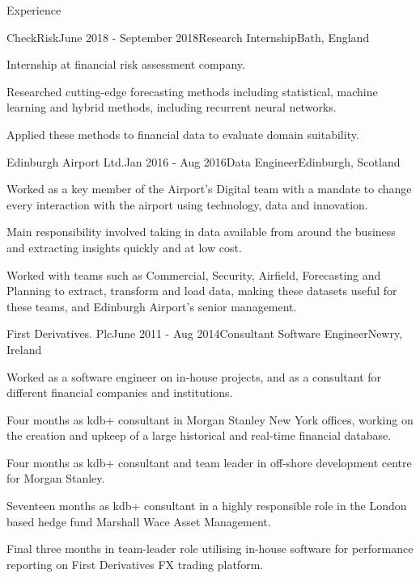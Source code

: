 \documentclass{resume} %
\begin{document}
\begin{rSection}{Experience}
  \begin{rSubsection}{CheckRisk}{June 2018 - September 2018}{Research Internship}{Bath, England}
    \item Internship at financial risk assessment company.
    \item Researched cutting-edge forecasting methods including statistical, machine learning and hybrid methods, including recurrent neural networks.
    \item Applied these methods to financial data to evaluate domain suitability.
  \end{rSubsection}

  \begin{rSubsection}{Edinburgh Airport Ltd.}{Jan 2016 - Aug 2016}{Data Engineer}{Edinburgh, Scotland}
    \item Worked as a key member of the Airport's Digital team with a mandate to change every interaction with the airport using technology, data and innovation.
    \item Main responsibility involved taking in data available from around the business and extracting insights quickly and at low cost.
    \item Worked with teams such as Commercial, Security, Airfield, Forecasting and Planning to extract, transform and load data, making these datasets useful for these teams, and Edinburgh Airport’s senior management.
  \end{rSubsection}

  \begin{rSubsection}{First Derivatives. Plc}{June 2011 - Aug 2014}{Consultant Software Engineer}{Newry, Ireland}
    \item Worked as a software engineer on in-house projects, and as a consultant for different financial companies and institutions.
    \item Four months as kdb+ consultant in Morgan Stanley New York offices, working on the creation and upkeep of a large historical and real-time financial database.
    \item Four months as kdb+ consultant and team leader in off-shore development centre for Morgan Stanley.
    \item Seventeen months as kdb+ consultant in a highly responsible role in the London based hedge fund Marshall Wace Asset Management.
    \item Final three months in team-leader role utilising in-house software for performance reporting on First Derivatives FX trading platform.
  \end{rSubsection}


\end{rSection}
\end{document}
